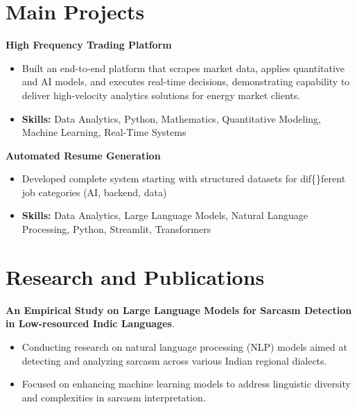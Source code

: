 \documentclass[a4paper,11pt]{article}
\begin{document}
\section{\textbf{Main Projects}}

\vspace{1mm}
  \textbf{High Frequency Trading Platform  }
\vspace{-1.5mm} %
\begin{itemize}
  \item Built an end-to-end platform that scrapes market data, applies quantitative and AI models, and executes real-time decisions, demonstrating capability to deliver high-velocity analytics solutions for energy market clients.
\vspace{-3mm}
  \item \textbf{Skills:} Data Analytics, Python, Mathematics, Quantitative Modeling, Machine Learning, Real-Time Systems
\end{itemize}


\vspace{1mm}
   \textbf{Automated Resume Generation }
\vspace{-1.5mm} %
\begin{itemize}
  \item Developed complete system starting with structured datasets for dif\{\}ferent job categories (AI, backend, data)
\vspace{-3mm}
  \item \textbf{Skills:} Data Analytics, Large Language Models, Natural Language Processing, Python, Streamlit, Transformers
\end{itemize}



\section{\textbf{Research and Publications} \hfill }
\vspace{1mm}
  \textbf{An Empirical Study on Large Language Models for Sarcasm Detection in Low-resourced Indic Languages}.
\vspace{-1mm} %
\begin{itemize}
  \item Conducting research on natural language processing (NLP) models aimed at detecting and analyzing sarcasm across various Indian regional dialects.
\vspace{-3mm}
  \item Focused on enhancing machine learning models to address linguistic diversity and complexities in sarcasm interpretation.
\end{itemize}
\end{document}
